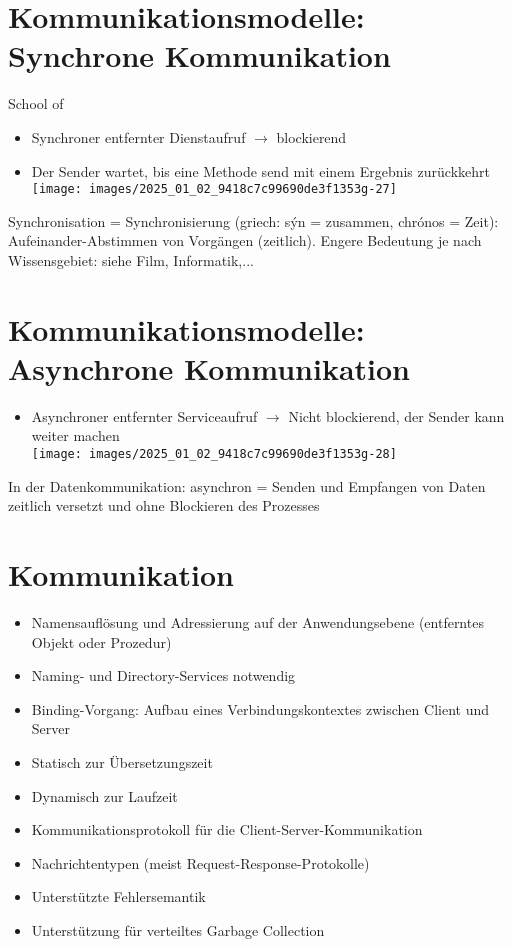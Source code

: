 \documentclass[10pt]{article}
\begin{document}
\section*{Kommunikationsmodelle: Synchrone Kommunikation}
School of

\begin{itemize}
  \item Synchroner entfernter Dienstaufruf $\rightarrow$ blockierend
  \item Der Sender wartet, bis eine Methode send mit einem Ergebnis zurückkehrt\\
\texttt{[image: images/2025\_01\_02\_9418c7c99690de3f1353g-27]}
\end{itemize}

Synchronisation = Synchronisierung (griech: sýn = zusammen, chrónos = Zeit): Aufeinander-Abstimmen von Vorgängen (zeitlich). Engere Bedeutung je nach Wissensgebiet: siehe Film, Informatik,...

\section*{Kommunikationsmodelle: \\
 Asynchrone Kommunikation}
\begin{itemize}
  \item Asynchroner entfernter Serviceaufruf $\rightarrow$ Nicht blockierend, der Sender kann weiter machen\\
\texttt{[image: images/2025\_01\_02\_9418c7c99690de3f1353g-28]}
\end{itemize}

In der Datenkommunikation: asynchron = Senden und Empfangen von Daten zeitlich versetzt und ohne Blockieren des Prozesses

\section*{Kommunikation}
\begin{itemize}
  \item Namensauflösung und Adressierung auf der Anwendungsebene (entferntes Objekt oder Prozedur)
  \item Naming- und Directory-Services notwendig
  \item Binding-Vorgang: Aufbau eines Verbindungskontextes zwischen Client und Server
  \item Statisch zur Übersetzungszeit
  \item Dynamisch zur Laufzeit
  \item Kommunikationsprotokoll für die Client-Server-Kommunikation
  \item Nachrichtentypen (meist Request-Response-Protokolle)
  \item Unterstützte Fehlersemantik
  \item Unterstützung für verteiltes Garbage Collection
\end{itemize}
\end{document}
